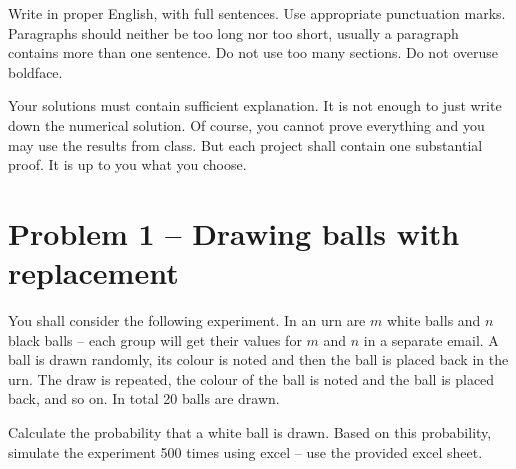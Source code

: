 \documentclass[12pt]{article}
\theoremstyle{definition}
\begin{document}
	Write in proper English, with full sentences. Use appropriate punctuation marks. Paragraphs should neither be too long nor too short, usually a paragraph contains more than one sentence. Do not use too many sections. Do not overuse boldface.
 
	Your solutions must contain sufficient explanation. It is not enough to just write down the numerical solution. Of course, you cannot prove everything and you may use the results from class. But each project shall contain one substantial proof. It is up to you what you choose.  
 
\section{Problem 1 -- Drawing balls with replacement}
 
	You shall consider the following experiment. In an urn are $m$ white balls and $n$ black balls  -- each group will get their values for $m$ and $n$ in a separate email. A ball is drawn randomly, its colour is noted and then the ball is placed back in the urn. The draw is repeated, the colour of the ball is noted and the ball is placed back, and so on. In total 20 balls are drawn.
 
	Calculate the probability that a white ball is drawn. Based on this probability, simulate the experiment 500 times using excel -- use the provided excel sheet. 
 
\end{document}
